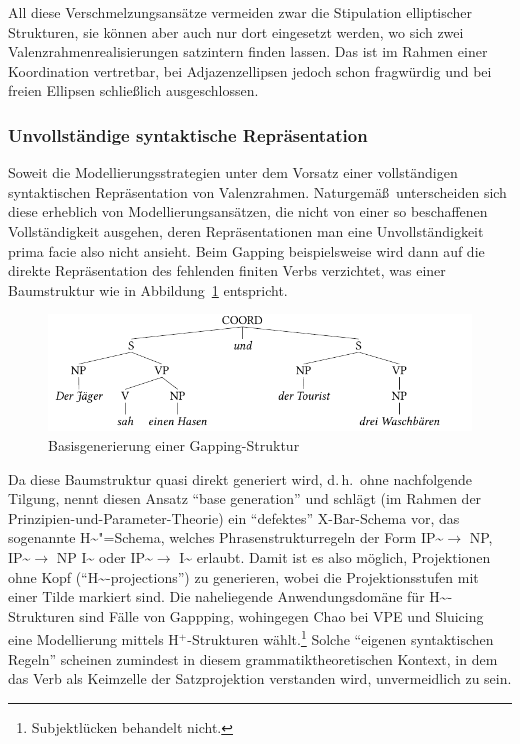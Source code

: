 All diese Verschmelzungsansätze vermeiden zwar die Stipulation elliptischer Strukturen, sie können aber auch nur dort eingesetzt werden, wo sich zwei Valenzrahmenrealisierungen satzintern finden lassen. Das ist im Rahmen einer Koordination vertretbar, bei Adjazenzellipsen jedoch schon fragwürdig und bei freien Ellipsen schlie\ss lich ausgeschlossen.

\subsubsection*{Unvollständige syntaktische Repräsentation}   

Soweit die Modellierungsstrategien unter dem Vorsatz einer vollständigen syntaktischen Repräsentation von Valenzrahmen. Naturgemä\ss\ unterscheiden sich diese erheblich von Modellierungsansätzen, die nicht von einer so beschaffenen Vollständigkeit ausgehen, deren Repräsentationen man eine Unvollständigkeit prima facie also nicht ansieht. Beim Gapping beispielsweise wird dann auf die direkte Repräsentation des fehlenden finiten Verbs verzichtet, was einer Baumstruktur wie in Abbildung~\ref{fig-ellipse-unvollstaendig} entspricht.
\begin{figure}[t]
\centering
\includegraphics{graphics/abb83.pdf}
\caption{\label{fig-ellipse-unvollstaendig}Basisgenerierung einer Gapping-Struktur}
\end{figure}
Da diese Baumstruktur quasi direkt generiert wird, d.\,h.\ ohne nachfolgende Tilgung, nennt \cite{Chao:87} diesen Ansatz "`base generation"' und schlägt (im Rahmen der Prinzipien-und-Parameter-Theorie) ein "`defektes"' X-Bar-Schema vor, das sogenannte H\~{}"=Schema, welches Phrasenstrukturregeln der Form IP\~{}$\to$ NP, IP\~{}$\to$ NP I\~{} oder IP\~{}$\to$ I\~{} erlaubt. Damit ist es also möglich, Projektionen ohne Kopf ("`H\textasciitilde-projections"') zu generieren, wobei die Projektionsstufen mit einer Tilde markiert sind. Die naheliegende Anwendungsdomäne für H\~{}-Strukturen sind Fälle von Gappping, wohingegen Chao bei VPE und Sluicing eine Modellierung mittels H$^{+}$-Strukturen wählt.\footnote{Subjektlücken behandelt \cite{Chao:87} nicht.} Solche "`eigenen syntaktischen Regeln"' \citep[789]{Klein:93} scheinen zumindest in diesem grammatiktheoretischen Kontext, in dem das Verb als Keimzelle der Satzprojektion verstanden wird, unvermeidlich zu sein. 

